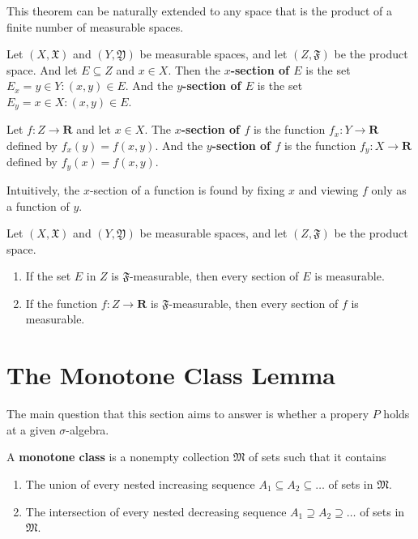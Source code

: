 This theorem can be naturally extended to any space that is the product of a finite number of measurable spaces.

\begin{definition}
	Let $(X, \mathfrak{X})$ and $(Y, \mathfrak{Y})$ be measurable spaces, and let $(Z, \mathfrak{F})$ be the product space. And let $E \subseteq Z$ and $x \in X$. Then the \textbf{$x$-section of $E$} is the set $E_x = {y \in Y : (x, y) \in E}$. And the \textbf{$y$-section of $E$} is the set $E_y = {x \in X : (x, y) \in E}$.

	Let $f : Z \longrightarrow \textbf{R}$ and let $x \in X$. The \textbf{$x$-section of $f$} is the function $f_x : Y \longrightarrow \textbf{R}$ defined by $f_x(y) = f(x,y)$. And the \textbf{$y$-section of $f$} is the function $f_y : X \longrightarrow \textbf{R}$ defined by $f_y(x) = f(x,y)$.
\end{definition}

Intuitively, the $x$-section of a function is found by fixing $x$ and viewing $f$ only as a function of $y$.

\begin{theorem}
	Let $(X, \mathfrak{X})$ and $(Y, \mathfrak{Y})$ be measurable spaces, and let $(Z, \mathfrak{F})$ be the product space.
	\begin{enumerate}
		\item If the set $E$ in $Z$ is $\mathfrak{F}$-measurable, then every section of $E$ is measurable. 
		\item If the function $f : Z \longrightarrow \textbf{R}$ is $\mathfrak{F}$-measurable, then every section of $f$ is measurable. 
	\end{enumerate}
\end{theorem}

\section{The Monotone Class Lemma}

The main question that this section aims to answer is whether a propery $P$ holds at a given $\sigma$-algebra. 

\begin{definition}
	A \textbf{monotone class} is a nonempty collection $\mathfrak{M}$ of sets such that it contains
	\begin{enumerate}
		\item The union of every nested increasing sequence $A_1 \subseteq A_2 \subseteq \ldots $ of sets in $\mathfrak{M}$.
		\item The intersection of every nested decreasing sequence $A_1 \supseteq A_2 \supseteq \ldots $ of sets in $\mathfrak{M}$.
	\end{enumerate}
\end{definition}

